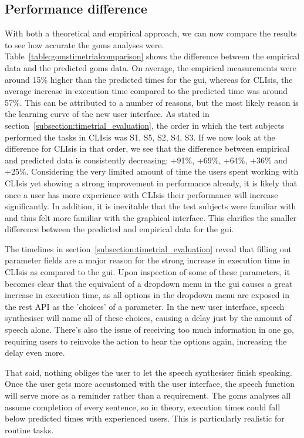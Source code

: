\subsection{Performance difference}
\label{subsection:performancedifference}
With both a theoretical and empirical approach, we can now compare the results to see how accurate the \acrshort{goms} analyses were. Table~\ref{table:gomstimetrialcomparison} shows the difference between the empirical data and the predicted \acrshort{goms} data. On average, the empirical measurements were around 15\% higher than the predicted times for the \acrshort{gui}, whereas for CLIsis, the average increase in execution time compared to the predicted time was around 57\%. This can be attributed to a number of reasons, but the most likely reason is the learning curve of the new user interface. As stated in section~\ref{subsection:timetrial_evaluation}, the order in which the test subjects performed the tasks in CLIsis was S1, S5, S2, S4, S3. If we now look at the difference for CLIsis in that order, we see that the difference between empirical and predicted data is consistently decreasing: +91\%, +69\%, +64\%, +36\% and +25\%. Considering the very limited amount of time the users spent working with CLIsis yet showing a strong improvement in performance already, it is likely that once a user has more experience with CLIsis their performance will increase significantly. In addition, it is inevitable that the test subjects were familiar with  and thus felt more familiar with the graphical interface. This clarifies the smaller difference between the predicted and empirical data for the \acrshort{gui}.

The timelines in section~\ref{subsection:timetrial_evaluation} reveal that filling out parameter fields are a major reason for the strong increase in execution time in CLIsis as compared to the \acrshort{gui}. Upon inspection of some of these parameters, it becomes clear that the equivalent of a dropdown menu in the \acrshort{gui} causes a great increase in execution time, as all options in the dropdown menu are exposed in the \acrshort{rest} API as the 'choices' of a parameter. In the new user interface, speech synthesiser will name all of these choices, causing a delay just by the amount of speech alone. There's also the issue of receiving too much information in one go, requiring users to reinvoke the action to hear the options again, increasing the delay even more.

That said, nothing obliges the user to let the speech synthesiser finish speaking. Once the user gets more accustomed with the user interface, the speech function will serve more as a reminder rather than a requirement. The \acrshort{goms} analyses all assume completion of every sentence, so in theory, execution times could fall below predicted times with experienced users. This is particularly realistic for routine tasks.

